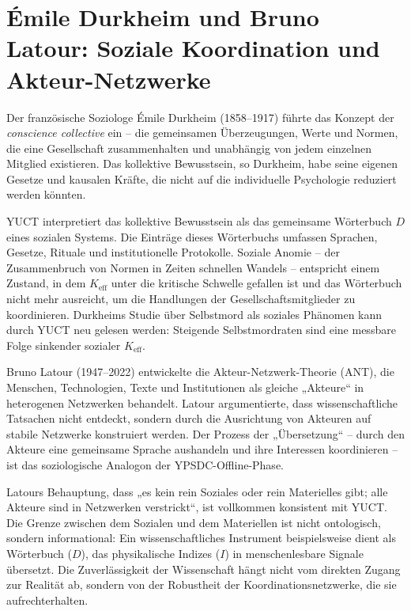 \documentclass[12pt,a4paper]{article}
\begin{document}
	\section{Émile Durkheim und Bruno Latour: Soziale Koordination und Akteur-Netzwerke}
	
	Der französische Soziologe Émile Durkheim (1858–1917) führte das Konzept der \emph{conscience collective} ein – die gemeinsamen Überzeugungen, Werte und Normen, die eine Gesellschaft zusammenhalten und unabhängig von jedem einzelnen Mitglied existieren. Das kollektive Bewusstsein, so Durkheim, habe seine eigenen Gesetze und kausalen Kräfte, die nicht auf die individuelle Psychologie reduziert werden könnten.
	
	YUCT interpretiert das kollektive Bewusstsein als das gemeinsame Wörterbuch \(D\) eines sozialen Systems. Die Einträge dieses Wörterbuchs umfassen Sprachen, Gesetze, Rituale und institutionelle Protokolle. Soziale Anomie – der Zusammenbruch von Normen in Zeiten schnellen Wandels – entspricht einem Zustand, in dem \(K_{\mathrm{eff}}\) unter die kritische Schwelle gefallen ist und das Wörterbuch nicht mehr ausreicht, um die Handlungen der Gesellschaftsmitglieder zu koordinieren. Durkheims Studie über Selbstmord als soziales Phänomen kann durch YUCT neu gelesen werden: Steigende Selbstmordraten sind eine messbare Folge sinkender sozialer \(K_{\mathrm{eff}}\).
	
	Bruno Latour (1947–2022) entwickelte die Akteur-Netzwerk-Theorie (ANT), die Menschen, Technologien, Texte und Institutionen als gleiche „Akteure“ in heterogenen Netzwerken behandelt. Latour argumentierte, dass wissenschaftliche Tatsachen nicht entdeckt, sondern durch die Ausrichtung von Akteuren auf stabile Netzwerke konstruiert werden. Der Prozess der „Übersetzung“ – durch den Akteure eine gemeinsame Sprache aushandeln und ihre Interessen koordinieren – ist das soziologische Analogon der YPSDC-Offline-Phase.
	
	Latours Behauptung, dass „es kein rein Soziales oder rein Materielles gibt; alle Akteure sind in Netzwerken verstrickt“, ist vollkommen konsistent mit YUCT. Die Grenze zwischen dem Sozialen und dem Materiellen ist nicht ontologisch, sondern informational: Ein wissenschaftliches Instrument beispielsweise dient als Wörterbuch (\(D\)), das physikalische Indizes (\(I\)) in menschenlesbare Signale übersetzt. Die Zuverlässigkeit der Wissenschaft hängt nicht vom direkten Zugang zur Realität ab, sondern von der Robustheit der Koordinationsnetzwerke, die sie aufrechterhalten.
	
\end{document}
